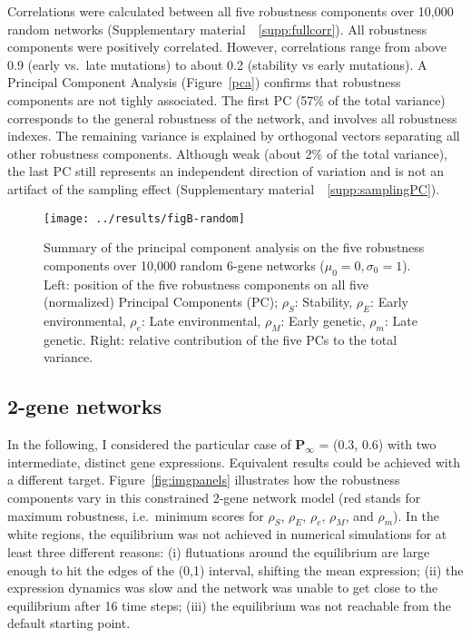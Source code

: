 \documentclass[10pt,a4paper]{article}
\newcommand{\stability}{{\rho_S}}
\newcommand{\earlyenv}{{\rho_E}}
\newcommand{\lateenv}{{\rho_e}}
\newcommand{\earlymut}{{\rho_M}}
\newcommand{\latemut}{{\rho_m}}
\newcommand{\SupMat}{Supplementary material~}
\begin{document}
Correlations were calculated between all five robustness components over 10,000 random networks (\SupMat~\ref{supp:fullcorr}). All robustness components were positively correlated. However, correlations range from above 0.9 (early vs.\ late mutations) to about 0.2 (stability vs early mutations). A Principal Component Analysis (Figure~\ref{pca}) confirms that robustness components are not tighly associated. The first PC (57\% of the total variance) corresponds to the general robustness of the network, and involves all robustness indexes. The remaining variance is explained by orthogonal vectors separating all other robustness components. Although weak (about 2\% of the total variance), the last PC still represents an independent direction of variation and is not an artifact of the sampling effect (\SupMat~\ref{supp:samplingPC}). 

\begin{figure}[t]
\begin{center}
\texttt{[image: ../results/figB-random]}
\caption{\color{Gray} \label{fig:pca} Summary of the principal component analysis on the five robustness components over 10,000 random 6-gene networks ($\mu_0=0, \sigma_0=1$). Left: position of the five robustness components on all five (normalized) Principal Components (PC); $\stability$: Stability, $\earlyenv$: Early environmental, $\lateenv$: Late environmental, $\earlymut$: Early genetic, $\latemut$: Late genetic. Right: relative contribution of the five PCs to the total variance.}
\end{center}
\end{figure}

\subsection{2-gene networks}

In the following, I considered the particular case of $\bm P_\infty$ = (0.3, 0.6) with two intermediate, distinct gene expressions. Equivalent results could be achieved with a different target. Figure~\ref{fig:imgpanels} illustrates how the robustness components vary in this constrained 2-gene network model (red stands for maximum robustness, i.e.\ minimum scores for $\stability$, $\earlyenv$, $\lateenv$, $\earlymut$, and $\latemut$). In the white regions, the equilibrium was not achieved in numerical simulations for at least three different reasons: (i) flutuations around the equilibrium are large enough to hit the edges of the (0,1) interval, shifting the mean expression; (ii) the expression dynamics was slow and the network was unable to get close to the equilibrium after 16 time steps; (iii) the equilibrium was not reachable from the default starting point.
\end{document}
